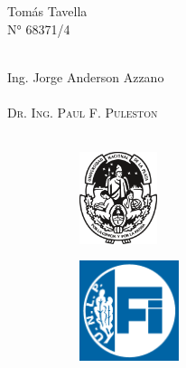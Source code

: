 \begin{titlepage}
\begin{center}
            Tomás Tavella
            \\
            N° 68371/4
            \\
            \vspace{0.1cm}
            \Large\scshape
            \normalfont
            \\
            \vspace{0.4cm}
            \begin{multicols}{2}
            \large\Medium
            Ing. Jorge Anderson Azzano
            \\
            \vspace{0.1cm}
            \Large\scshape
            \normalfont
            \\
            \columnbreak
            \vspace{0.6cm}
            \large\Medium
            Dr. Ing. Paul F. Puleston
            \\
            \vspace{0.1cm}
            \Large\scshape
            \normalfont
            \\
            \end{multicols}
            \vfill
            \begin{figure}[H]
                \centering
                \begin{subfigure}
                    \centering
                    \includegraphics[width=0.25\textwidth]{Imagenes/UNLP.pdf}
                \end{subfigure}
                \begin{subfigure}
                    \centering
                    \includegraphics[width=0.32\textwidth]{Imagenes/FI Invertido.png}

\end{subfigure}
\end{figure}
\end{center}
\end{titlepage}
